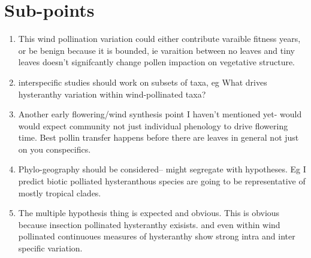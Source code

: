 \documentclass{article}\usepackage[]{graphicx}\usepackage[]{color}
\begin{document}
\section*{Sub-points}
\begin{enumerate}
\item This wind pollination variation could either contribute varaible fitness years, or be benign because it is bounded, ie varaition between no leaves and tiny leaves doesn't signifcantly change pollen impaction on vegetative structure.
\item interspecific studies should work on subsets of taxa, eg What drives hysteranthy variation within wind-pollinated taxa?
\item Another early flowering/wind synthesis point I haven't mentioned yet- would would expect community not just individual  phenology to drive flowering time. Best pollin transfer happens before there are leaves in general not just on you conspecifics.
\item Phylo-geography should be considered-- might segregate with hypotheses. Eg I predict biotic polliated hysteranthous species are going to be representative of mostly tropical clades.

\item The multiple hypothesis thing is expected and obvious. This is obvious because insection pollinated hysteranthy exisists. and even within wind pollinated continuoues measures of hysteranthy show strong intra and inter specific variation.
\end{enumerate}
\end{document}
